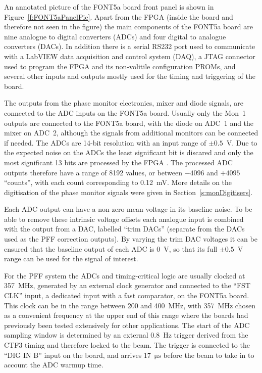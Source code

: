 An annotated picture of the FONT5a board front panel is shown in Figure~\ref{f:FONT5aPanelPic}. Apart from the FPGA (inside the board and therefore not seen in the figure) the main components of the FONT5a board are nine analogue to digital converters (ADCs) and four digital to analogue converters (DACs). In addition there is a serial RS232 port used to communicate with a LabVIEW data acquisition and control system (DAQ), a JTAG connector used to program the FPGA and its non-volitile configuration PROMs, and several other inputs and outputs mostly used for the timing and triggering of the board.

The outputs from the phase monitor electronics, mixer and diode signals, are connected to the ADC inputs on the FONT5a board. Usually only the Mon~1 outputs are connected to the FONT5a board, with the diode on ADC~1 and the mixer on ADC~2, although the signals from additional monitors can be connected if needed. The ADCs are 14-bit resolution with an input range of \(\pm0.5\)~V. Due to the expected noise on the ADCs the least significant bit is discared and only the most significant 13 bits are processed by the FPGA \cite{fontPaper}. The processed ADC outputs therefore have a range of 8192 values, or between \(-4096\) and \(+4095\) ``counts'', with each count corresponding to 0.12~mV. More details on the digitisation of the phase monitor signals were given in Section~\ref{s:monDigitisers}. 

Each ADC output can have a non-zero mean voltage in its baseline noise. To be able to remove these intrinsic voltage offsets each analogue input is combined with the output from a DAC, labelled ``trim DACs'' (separate from the DACs used as the PFF correction outputs). By varying the trim DAC voltages it can be ensured that the baseline output of each ADC is 0~V, so that its full \(\pm0.5\)~V range can be used for the signal of interest.

For the PFF system the ADCs and timing-critical logic are usually clocked at 357~MHz, generated by an external clock generator \cite{srsClockGen} and connected to the ``FST CLK'' input, a dedicated input with a fast comparator, on the FONT5a board. 
This clock can be in the range between 200 and 400~MHz, with 357~MHz chosen as a convenient frequency at the upper end of this range where the boards had previously been tested extensively for other applications.
The start of the ADC sampling window is determined by an external 0.8~Hz trigger derived from the CTF3 timing and therefore locked to the beam. The trigger is connected to the ``DIG IN B'' input on the board, and arrives 17~\(\mathrm{\mu s}\) before the beam to take in to account the ADC warmup time.

